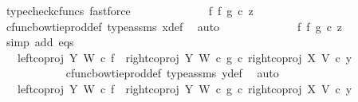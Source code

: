 \begin{isabellebody}
\ {\isacharparenleft}{\kern0pt}typecheck{\isacharunderscore}{\kern0pt}cfuncs{\isacharcomma}{\kern0pt}\ fastforce{\isacharparenright}{\kern0pt}\isanewline
\ \ \ \ \ \ \ \ \isamarkupfalse%
\ \isamarkupfalse%
\ {\isachardoublequoteopen}{\isachardot}{\kern0pt}{\isachardot}{\kern0pt}{\isachardot}{\kern0pt}\ {\isacharequal}{\kern0pt}\ {\isacharparenleft}{\kern0pt}f\ {\isasymbowtie}\isactrlsub f\ g{\isacharparenright}{\kern0pt}\ {\isasymcirc}\isactrlsub c\ z{}{\isachardoublequoteclose}\isanewline
\ \ \ \ \ \ \ \ \ \ \isamarkupfalse%
\ cfunc{\isacharunderscore}{\kern0pt}bowtie{\isacharunderscore}{\kern0pt}prod{\isacharunderscore}{\kern0pt}def{}\ type{\isacharunderscore}{\kern0pt}assms\ x{}{\isacharunderscore}{\kern0pt}def\ \isamarkupfalse%
\ auto\isanewline
\ \ \ \ \ \ \ \ \isamarkupfalse%
\ \isamarkupfalse%
\ {\isachardoublequoteopen}{\isachardot}{\kern0pt}{\isachardot}{\kern0pt}{\isachardot}{\kern0pt}\ {\isacharequal}{\kern0pt}\ {\isacharparenleft}{\kern0pt}f\ {\isasymbowtie}\isactrlsub f\ g{\isacharparenright}{\kern0pt}\ {\isasymcirc}\isactrlsub c\ z{}{\isachardoublequoteclose}\isanewline
\ \ \ \ \ \ \ \ \ \ \isamarkupfalse%
\ {\isacharparenleft}{\kern0pt}simp\ add{\isacharcolon}{\kern0pt}\ eqs{\isacharparenright}{\kern0pt}\isanewline
\ \ \ \ \ \ \ \ \isamarkupfalse%
\ \isamarkupfalse%
\ {\isachardoublequoteopen}{\isachardot}{\kern0pt}{\isachardot}{\kern0pt}{\isachardot}{\kern0pt}\ {\isacharequal}{\kern0pt}\ {\isacharparenleft}{\kern0pt}{\isacharparenleft}{\kern0pt}left{\isacharunderscore}{\kern0pt}coproj\ Y\ W\ {\isasymcirc}\isactrlsub c\ f{\isacharparenright}{\kern0pt}\ {\isasymamalg}\ {\isacharparenleft}{\kern0pt}right{\isacharunderscore}{\kern0pt}coproj\ Y\ W\ {\isasymcirc}\isactrlsub c\ g{\isacharparenright}{\kern0pt}{\isacharparenright}{\kern0pt}\ {\isasymcirc}\isactrlsub c\ right{\isacharunderscore}{\kern0pt}coproj\ X\ V\ {\isasymcirc}\isactrlsub c\ y{}{\isachardoublequoteclose}\isanewline
\ \ \ \ \ \ \ \ \ \ \isamarkupfalse%
\ cfunc{\isacharunderscore}{\kern0pt}bowtie{\isacharunderscore}{\kern0pt}prod{\isacharunderscore}{\kern0pt}def{}\ type{\isacharunderscore}{\kern0pt}assms\ y{}{\isacharunderscore}{\kern0pt}def\ \isamarkupfalse%
\ auto\isanewline
\ \ \ \ \ \ \ \ \isamarkupfalse%
\ \isamarkupfalse%
\ {\isachardoublequoteopen}{\isachardot}{\kern0pt}{\isachardot}{\kern0pt}{\isachardot}{\kern0pt}\ {\isacharequal}{\kern0pt}\ {\isacharparenleft}{\kern0pt}{\isacharparenleft}{\kern0pt}{\isacharparenleft}{\kern0pt}left{\isacharunderscore}{\kern0pt}coproj\ Y\ W\ {\isasymcirc}\isactrlsub c\ f{\isacharparenright}{\kern0pt}\ {\isasymamalg}\ {\isacharparenleft}{\kern0pt}right{\isacharunderscore}{\kern0pt}coproj\ Y\ W\ {\isasymcirc}\isactrlsub c\ g{\isacharparenright}{\kern0pt}{\isacharparenright}{\kern0pt}\ {\isasymcirc}\isactrlsub c\ right{\isacharunderscore}{\kern0pt}coproj\ X\ V{\isacharparenright}{\kern0pt}\ {\isasymcirc}\isactrlsub c\ y{}{\isachardoublequoteclose}\isanewline

\end{isabellebody}
